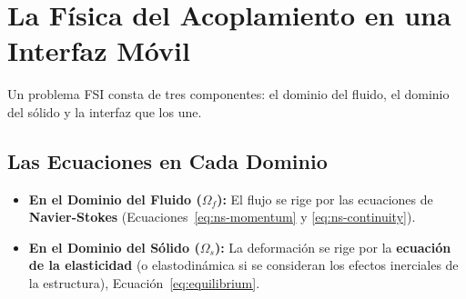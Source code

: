 \section{La Física del Acoplamiento en una Interfaz Móvil}
\label{sec:fsi-theory}
Un problema FSI consta de tres componentes: el dominio del fluido, el dominio del sólido y la interfaz que los une.

\subsection{Las Ecuaciones en Cada Dominio}
\begin{itemize}
    \item \textbf{En el Dominio del Fluido (\(\Omega_f\)):} El flujo se rige por las ecuaciones de \textbf{Navier-Stokes} (Ecuaciones~\eqref{eq:ns-momentum} y \eqref{eq:ns-continuity}).
    \item \textbf{En el Dominio del Sólido (\(\Omega_s\)):} La deformación se rige por la \textbf{ecuación de la elasticidad} (o elastodinámica si se consideran los efectos inerciales de la estructura), Ecuación~\eqref{eq:equilibrium}.
\end{itemize}

